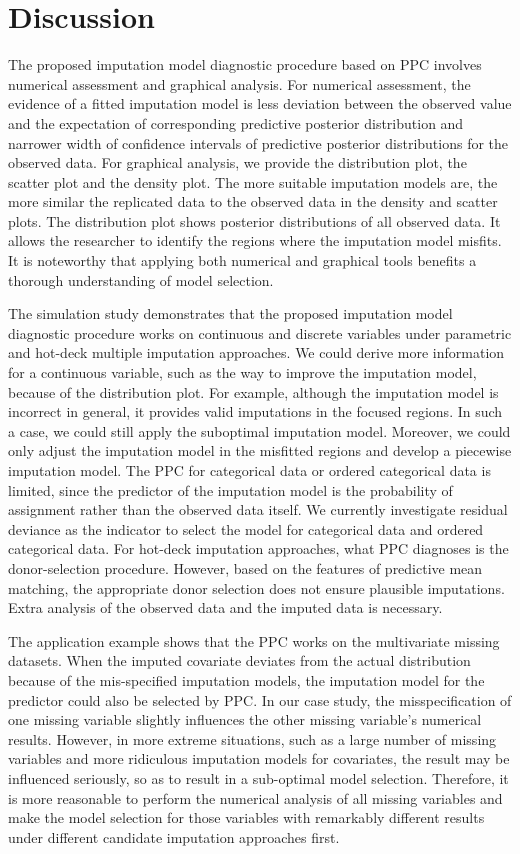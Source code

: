 	\section{Discussion}
	\label{sec:6.7}
	The proposed imputation model diagnostic procedure based on PPC involves numerical assessment and graphical analysis. For numerical assessment, the evidence of a fitted imputation model is less deviation between the observed value and the expectation of corresponding predictive posterior distribution and narrower width of confidence intervals of predictive posterior distributions for the observed data. For graphical analysis, we provide the distribution plot, the scatter plot and the density plot. The more suitable imputation models are, the more similar the replicated data to the observed data in the density and scatter plots. The distribution plot shows posterior distributions of all observed data. It allows the researcher to identify the regions where the imputation model misfits. It is noteworthy that applying both numerical and graphical tools benefits a thorough understanding of model selection.
	
	The simulation study demonstrates that the proposed imputation model diagnostic procedure works on continuous and discrete variables under parametric and hot-deck multiple imputation approaches. We could derive more information for a continuous variable, such as the way to improve the imputation model, because of the distribution plot. For example, although the imputation model is incorrect in general, it provides valid imputations in the focused regions. In such a case, we could still apply the suboptimal imputation model. Moreover, we could only adjust the imputation model in the misfitted regions and develop a piecewise imputation model. The PPC for categorical data or ordered categorical data is limited, since the predictor of the imputation model is the probability of assignment rather than the observed data itself. We currently investigate residual deviance as the indicator to select the model for categorical data and ordered categorical data. For hot-deck imputation approaches, what PPC diagnoses is the donor-selection procedure. However, based on the features of predictive mean matching, the appropriate donor selection does not ensure plausible imputations. Extra analysis of the observed data and the imputed data is necessary.   
	
	The application example shows that the PPC works on the multivariate missing datasets. When the imputed covariate deviates from the actual distribution because of the mis-specified imputation models, the imputation model for the predictor could also be selected by PPC. In our case study, the misspecification of one missing variable slightly influences the other missing variable's numerical results. However, in more extreme situations, such as a large number of missing variables and more ridiculous imputation models for covariates, the result may be influenced seriously, so as to result in a sub-optimal model selection. Therefore, it is more reasonable to perform the numerical analysis of all missing variables and make the model selection for those variables with remarkably different results under different candidate imputation approaches first. 
	

